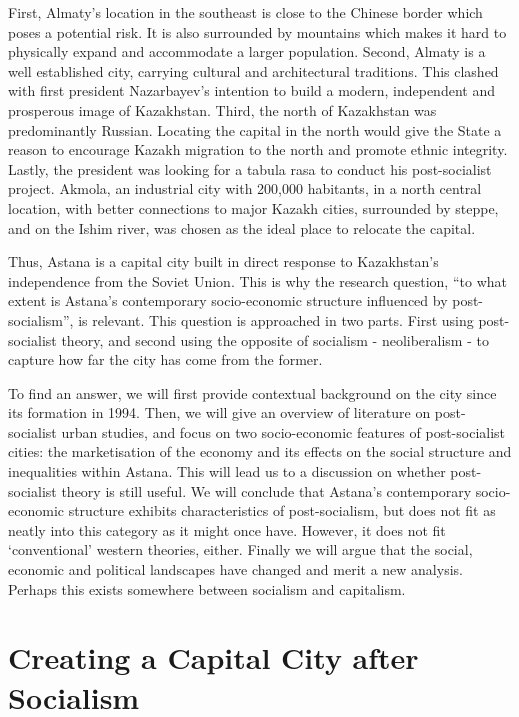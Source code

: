 \documentclass{article}
\begin{document}
First, Almaty's location in the southeast is close to the Chinese border which poses a potential risk. It is also surrounded by mountains which makes it hard to physically expand and accommodate a larger population. Second, Almaty is a well established city, carrying cultural and architectural traditions. This clashed with first president Nazarbayev's intention to build a modern, independent and prosperous image of Kazakhstan. Third, the north of Kazakhstan was predominantly Russian. Locating the capital in the north would give the State a reason to encourage Kazakh migration to the north and promote ethnic integrity. Lastly, the president was looking for a tabula rasa to conduct his post-socialist project. Akmola, an industrial city with 200,000 habitants, in a north central location, with better connections to major Kazakh cities, surrounded by steppe, and on the Ishim river, was chosen as the ideal place to relocate the capital.

Thus, Astana is a capital city built in direct response to Kazakhstan's independence from the Soviet Union. This is why the research question, “to what extent is Astana's contemporary socio-economic structure influenced by post-socialism”, is relevant. This question is approached in two parts. First using post-socialist theory, and second using the opposite of socialism - neoliberalism - to capture how far the city has come from the former.

To find an answer, we will first provide contextual background on the city since its formation in 1994. Then, we will give an overview of literature on post-socialist urban studies, and focus on two socio-economic features of post-socialist cities: the marketisation of the economy and its effects on the social structure and inequalities within Astana. This will lead us to a discussion on whether post-socialist theory is still useful. We will conclude that Astana's contemporary socio-economic structure exhibits characteristics of post-socialism, but does not fit as neatly into this category as it might once have. However, it does not fit `conventional' western theories, either. Finally we will argue that the social, economic and political landscapes have changed and merit a new analysis. Perhaps this exists somewhere between socialism and capitalism.

\section{Creating a Capital City after Socialism}
\end{document}
